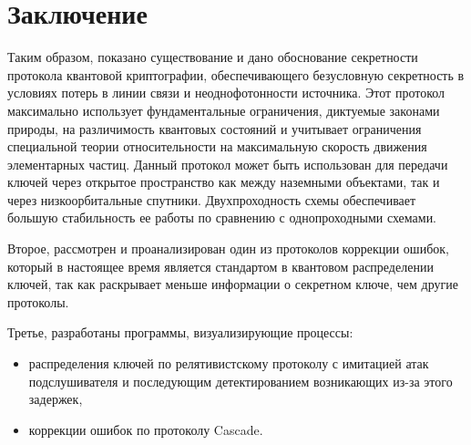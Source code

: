 \chapter*{Заключение}				%
Таким образом, показано существование и дано обоснование секретности протокола квантовой криптографии, обеспечивающего безусловную секретность в условиях потерь в линии связи и неоднофотонности источника.
Этот протокол максимально использует фундаментальные ограничения, диктуемые законами природы, на различимость квантовых состояний и учитывает ограничения специальной теории относительности на максимальную скорость движения элементарных частиц. Данный протокол может быть использован для передачи ключей через открытое пространство как между наземными объектами, так и через низкоорбитальные спутники. Двухпроходность схемы обеспечивает большую стабильность ее работы по сравнению с однопроходными схемами.

Второе, рассмотрен и проанализирован один из протоколов коррекции ошибок, который в настоящее время является стандартом в квантовом распределении ключей, так как раскрывает меньше информации о секретном ключе, чем другие протоколы.

Третье, разработаны программы, визуализирующие процессы:
\begin{itemize}
  \item распределения ключей по релятивистскому протоколу с имитацией атак подслушивателя и последующим детектированием возникающих из-за этого задержек,
  \item коррекции ошибок по протоколу Cascade.
\end{itemize}


